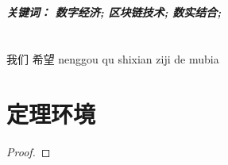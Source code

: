 \documentclass[12pt,hyperref,a4paper,UTF8]{ctexart}
\begin{document}
\cover
\begin{abstract}

对于所有 的 经济体 来说 如 发 站 经济 都是重要的

\end{abstract}
{\bf\emph{ 关键词： 数字经济; 区块链技术; 数实结合;  }\rm}
\thispagestyle{empty} %

\newpage
\tableofcontents

\newpage


\section{}

我们 希望 nenggou qu shixian ziji de mubia \cite{0Isaac}

\section{定理环境}
\begin{Theorem}
\end{Theorem}

\begin{Lemma}
\end{Lemma}

\begin{Corollary}
\end{Corollary}

\begin{Proposition}
\end{Proposition}

\begin{Definition}
\end{Definition}

\begin{Example}
\end{Example}

\begin{proof}
\end{proof}




\newpage
{}
\end{document}

